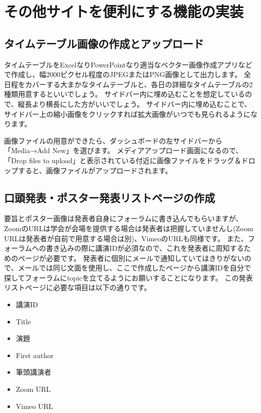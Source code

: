 \documentclass[titlepage,10pt,a4paper,uplatex]{jsbook}
\begin{document}
\section{その他サイトを便利にする機能の実装}

\subsection{タイムテーブル画像の作成とアップロード}

タイムテーブルをExcelなりPowerPointなり適当なベクター画像作成アプリなどで作成し、幅2000ピクセル程度のJPEGまたはPNG画像として出力します。
全日程をカバーする大まかなタイムテーブルと、各日の詳細なタイムテーブルの2種類用意するといいでしょう。
サイドバー内に埋め込むことを想定しているので、縦長より横長にした方がいいでしょう。
サイドバー内に埋め込むことで、サイドバー上の縮小画像をクリックすれば拡大画像がいつでも見られるようになります。

画像ファイルの用意ができたら、ダッシュボードの左サイドバーから「Media→Add New」を選びます。
メディアアップロード画面になるので、「Drop files to upload」と表示されている付近に画像ファイルをドラッグ＆ドロップすると、画像ファイルがアップロードされます。

\subsection{口頭発表・ポスター発表リストページの作成}

要旨とポスター画像は発表者自身にフォーラムに書き込んでもらいますが、ZoomのURLは学会が会場を提供する場合は発表者は把握していませんし(Zoom URLは発表者が自前で用意する場合は別)、VimeoのURLも同様です。
また、フォーラムへの書き込みの際に講演IDが必須なので、これを発表者に周知するためのページが必要です。
発表者に個別にメールで通知していてはきりがないので、メールでは同じ文面を使用し、ここで作成したページから講演IDを自分で探してフォーラムにtopicを立てるようにお願いすることになります。
この発表リストページに必要な項目は以下の通りです。

\begin{itemize}
\item 講演ID
\item Title
\item 演題
\item First author
\item 筆頭講演者
\item Zoom URL
\item Vimeo URL
\end{itemize}
\end{document}

